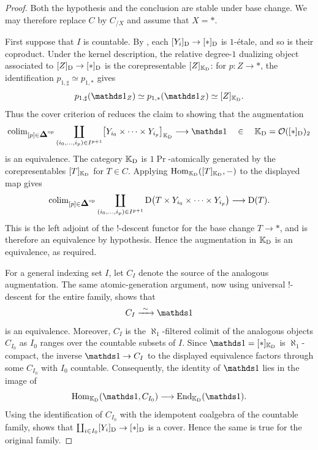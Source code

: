 \documentclass[11pt]{book}
\begin{document}
	\begin{proof}
		Both the hypothesis and the conclusion are stable under base change. We may therefore replace $C$ by $C_{/X}$ and assume that $X=\ast$.

		First suppose that $I$ is countable. By , each $[Y_i]_{\operatorname{\mathrm{D}}}\to[\ast]_{\operatorname{\mathrm{D}}}$ is $1$-\'etale, and so is their coproduct. Under the kernel description, the relative degree-$1$ dualizing object associated to $[Z]_{\operatorname{\mathrm{D}}}\to[\ast]_{\operatorname{\mathrm{D}}}$ is the corepresentable $[Z]_{\mathbb{K}_{\operatorname{\mathrm{D}}}}$: for $p\colon Z\to\ast$, the identification $p_{1,\sharp}\simeq p_{1,*}$ gives
		\[
			p_{1,\sharp}(\unit_Z)\simeq p_{1,*}(\unit_Z)\simeq[Z]_{\bbK_{\D}}.
		\]
		Thus the cover criterion of  reduces the claim to showing that the augmentation
		\[
			\colim_{[p]\in\simp\catop}
			\coprod_{(i_0,\ldots,i_p)\in I^{p+1}}
			\bigl[Y_{i_0}\times\cdots\times Y_{i_p}\bigr]_{\bbK_{\D}}
			\longrightarrow
			\unit
			\qin\bbK_{\D}=\Oo([\ast]_{\D})_2
		\]
		is an equivalence. The category $\mathbb{K}_{\operatorname{\mathrm{D}}}$ is $1\Pr$-atomically generated by the corepresentables $[T]_{\mathbb{K}_{\operatorname{\mathrm{D}}}}$ for $T\in C$. Applying $\operatorname{Hom}_{\mathbb{K}_{\operatorname{\mathrm{D}}}}([T]_{\mathbb{K}_{\operatorname{\mathrm{D}}}},-)$ to the displayed map gives
		\[
			\colim_{[p]\in\simp\catop}
			\coprod_{(i_0,\ldots,i_p)\in I^{p+1}}
			\D\bigl(T\times Y_{i_0}\times\cdots\times Y_{i_p}\bigr)
			\longrightarrow \D(T).
		\]
		This is the left adjoint of the $!$-descent functor for the base change $T\to\ast$, and is therefore an equivalence by hypothesis. Hence the augmentation in $\mathbb{K}_{\operatorname{\mathrm{D}}}$ is an equivalence, as required.

		For a general indexing set $I$, let $C_I$ denote the source of the analogous augmentation. The same atomic-generation argument, now using universal $!$-descent for the entire family, shows that
		\[
			C_I\xrightarrow{\ \sim\ }\unit
		\]
		is an equivalence. Moreover, $C_I$ is the $\aleph_1$-filtered colimit of the analogous objects $C_{I_0}$ as $I_0$ ranges over the countable subsets of $I$. Since $\unit=[\ast]_{\bbK_{\D}}$ is $\aleph_1$-compact, the inverse $\unit\to C_I$ to the displayed equivalence factors through some $C_{I_0}$ with $I_0$ countable. Consequently, the identity of $\unit$ lies in the image of
		\[
			\Hom_{\bbK_{\D}}(\unit,C_{I_0})
			\longrightarrow
			\End_{\bbK_{\D}}(\unit).
		\]
		Using the identification of $C_{I_0}$ with the idempotent coalgebra of the countable family,  shows that $\coprod_{i\in I_0}[Y_i]_{\operatorname{\mathrm{D}}}\to[\ast]_{\operatorname{\mathrm{D}}}$ is a cover. Hence the same is true for the original family.
	\end{proof}
\end{document}
